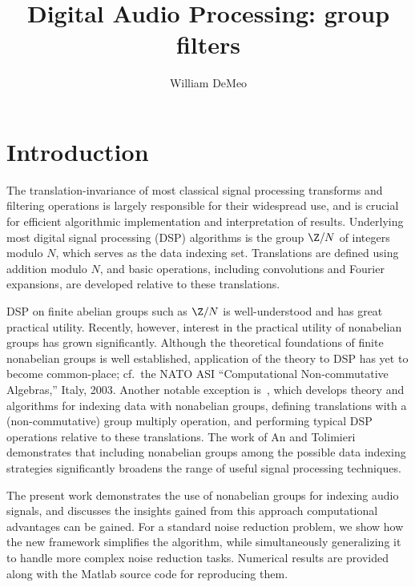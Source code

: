 \title{Digital Audio Processing: group filters}
\author{William DeMeo}\authorrunning{ }
\maketitle

\section{Introduction}
The translation-invariance of most classical signal
processing transforms and filtering operations is largely
responsible for their widespread use, and is crucial for
efficient algorithmic implementation and interpretation 
of results. Underlying most digital signal processing (DSP)
algorithms is the group $\Z/N$ of integers modulo $N$, which
serves as the data indexing set.  Translations are defined
using addition modulo $N$, and basic operations, including
convolutions and Fourier expansions, are developed relative
to these translations.

DSP on finite abelian groups such as $\Z/N$ is
well-understood and has great practical utility.  Recently,
however, interest in the practical utility of nonabelian
groups has grown significantly. Although the theoretical
foundations of finite nonabelian groups is well established,
application of the theory to DSP has yet to  become
common-place; cf.~the NATO ASI ``Computational
Non-commutative Algebras,'' Italy, 2003. Another notable
exception is~\cite{An:2003}, which develops theory and
algorithms for indexing data with nonabelian
groups, defining translations with a (non-commutative) group
multiply operation, and performing typical DSP operations
relative to these translations. The work of An and Tolimieri
demonstrates that including nonabelian groups among the
possible data indexing strategies significantly broadens the
range of useful signal processing techniques.

The present work demonstrates the use of nonabelian groups
for indexing audio signals, and discusses the insights gained
from this approach computational advantages can be gained. 
For a standard noise reduction problem, we show
how the new framework simplifies the algorithm, while
simultaneously generalizing it to handle more complex noise
reduction tasks. Numerical results are provided along with
the Matlab source code for reproducing them. 


